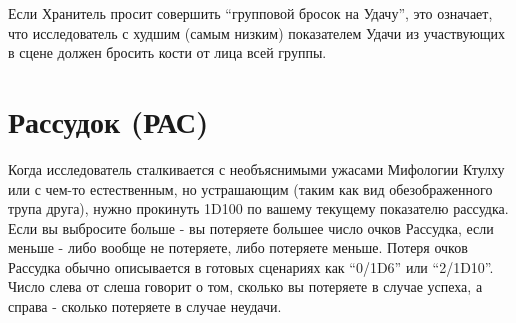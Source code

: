 \documentclass[letterpaper,twocolumn,openany, twoside, 11pt, usenames]{cocbook}
\begin{document}
Если Хранитель просит совершить ``групповой бросок на Удачу'', это означает, что исследователь с худшим (самым низким) показателем Удачи из участвующих в сцене должен бросить кости от лица всей группы.
\smallbreak
\noindent {}

\section*{Рассудок (РАС)}

Когда исследователь сталкивается с необъяснимыми ужасами Мифологии Ктулху или с чем-то естественным, но устрашающим (таким как вид обезображенного трупа друга), нужно прокинуть 1D100 по вашему текущему показателю рассудка. Если вы выбросите больше - вы потеряете большее число очков Рассудка, если меньше - либо вообще не потеряете, либо потеряете меньше. Потеря очков Рассудка обычно описывается в готовых сценариях как ``0/1D6'' или ``2/1D10''. Число слева от слеша говорит о том, сколько вы потеряете в случае успеха, а справа - сколько потеряете в случае неудачи.
\end{document}
